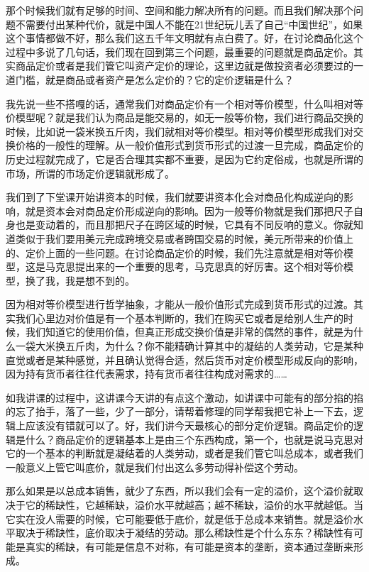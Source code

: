\documentclass[UTF8, 12pt, a4paper]{ctexrep}
\begin{document}
那个时候我们就有足够的时间、空间和能力解决所有的问题。而且我们解决那个问题不需要付出某种代价，就是中国人不能在21世纪玩儿丢了自己“中国世纪”，如果这个事情都做不好，那么我们这五千年文明就有点白费了。好，在讨论商品化这个过程中多说了几句话，我们现在回到第三个问题，最重要的问题就是商品定价。其实商品定价或者是我们管它叫资产定价的理论，这里边就是做投资者必须要过的一道门槛，就是商品或者资产是怎么定价的？它的定价逻辑是什么？

我先说一些不搭嘎的话，通常我们对商品定价有一个相对等价模型，什么叫相对等价模型呢？就是我们认为商品是能交易的，如无一般等价物，我们进行商品交换的时候，比如说一袋米换五斤肉，我们就相对等价模型。相对等价模型形成我们对交换价格的一般性的理解。从一般价值形式到货币形式的过渡一旦完成，商品定价的历史过程就完成了，它是否合理其实都不重要，是因为它约定俗成，也就是所谓的市场，所谓的市场定价逻辑就形成了。

我们到了下堂课开始讲资本的时候，我们就要讲资本化会对商品化构成逆向的影响，就是资本会对商品定价形成逆向的影响。因为一般等价物就是我们那把尺子自身也是变动着的，而且那把尺子在跨区域的时候，它具有不同反响的意义。你就知道类似于我们要用美元完成跨境交易或者跨国交易的时候，美元所带来的价值上的、定价上面的一些问题。在讨论商品定价的时候，我们先注意就是相对等价模型，这是马克思提出来的一个重要的思考，马克思真的好厉害。这个相对等价模型，换了我，我是想不到的。

因为相对等价模型进行哲学抽象，才能从一般价值形式完成到货币形式的过渡。其实我们心里边对价值是有一个基本判断的，我们在购买它或者是给别人生产的时候，我们知道它的使用价值，但真正形成交换价值是非常的偶然的事件，就是为什么一袋大米换五斤肉，为什么？你不能精确计算其中的凝结的人类劳动，它是某种直觉或者是某种感觉，并且确认觉得合适，然后货币对定价模型形成反向的影响，因为持有货币者往往代表需求，持有货币者往往构成对需求的……

如我讲课的过程中，这讲课今天讲的有点这个激动，如讲课中可能有的部分掐的掐的忘了抬手，落了一些，少了一部分，请帮着修理的同学帮我把它补上一下去，逻辑上应该没有错就可以了。好，我们讲今天最核心的部分定价逻辑。商品定价的逻辑是什么？商品定价的逻辑基本上是由三个东西构成，第一个，也就是说马克思对它的一个基本的判断就是凝结着的人类劳动，或者是我们管它叫总成本，或者我们一般意义上管它叫底价，就是我们付出这么多劳动得补偿这个劳动。

那么如果是以总成本销售，就少了东西，所以我们会有一定的溢价，这个溢价就取决于它的稀缺性，它越稀缺，溢价水平就越高；越不稀缺，溢价的水平就越低。当它实在没人需要的时候，它可能要低于底价，就是低于总成本来销售。就是溢价水平取决于稀缺性，底价取决于凝结的劳动。那么稀缺性是个什么东东？稀缺性有可能是真实的稀缺，有可能是信息不对称，有可能是资本的垄断，资本通过垄断来形成。
\end{document}
